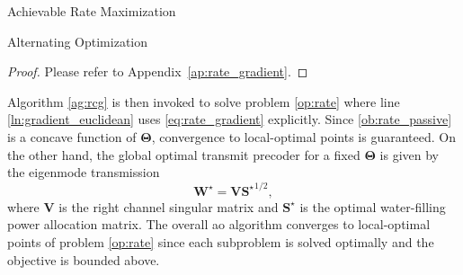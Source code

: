 \documentclass[journal]{IEEEtran}
\begin{document}
\begin{section}{Achievable Rate Maximization}
\begin{subsection}{Alternating Optimization}
		\begin{proof}
			Please refer to Appendix~\ref{ap:rate_gradient}.
		\end{proof}
		Algorithm \ref{ag:rcg} is then invoked to solve problem \eqref{op:rate} where line \ref{ln:gradient_euclidean} uses \eqref{eq:rate_gradient} explicitly.
		Since \eqref{ob:rate_passive} is a concave function of $\mathbf{\Theta}$, convergence to local-optimal points is guaranteed.
		On the other hand, the global optimal transmit precoder for a fixed $\mathbf{\Theta}$ is given by the eigenmode transmission \cite{Clerckx2013}
		\begin{equation}
			\mathbf{W}^\star = \mathbf{V} {\mathbf{S}^\star}^{1/2},
			\label{eq:precoder_eigenmode}
		\end{equation}
		where $\mathbf{V}$ is the right channel singular matrix and $\mathbf{S}^\star$ is the optimal water-filling power allocation matrix.
		The overall \gls{ao} algorithm converges to local-optimal points of problem \eqref{op:rate} since each subproblem is solved optimally and the objective is bounded above.
	\end{subsection}


\end{section}
\end{document}
